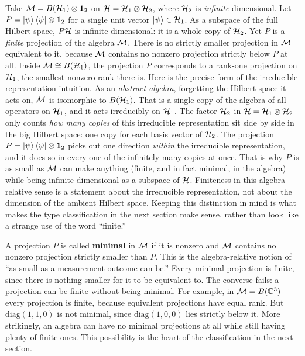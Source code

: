 Take $\mathcal{M}=B(\mathcal{H}_1)\otimes\mathbf{1}_2$ on $\mathcal{H}=\mathcal{H}_1\otimes\mathcal{H}_2$, where $\mathcal{H}_2$ is \emph{infinite}-dimensional. Let
$P=\ket\psi\bra\psi\otimes\mathbf{1}_2$ for a single unit vector $\ket\psi\in\mathcal{H}_1$. As a subspace of the full
Hilbert space, $P\mathcal{H}$ is infinite-dimensional: it is a whole copy of $\mathcal{H}_2$. Yet $P$ is a \emph{finite}
projection of the algebra $\mathcal{M}$. There is no strictly smaller projection in $\mathcal{M}$ equivalent to it, because
$\mathcal{M}$ contains no nonzero projection strictly below $P$ at all. Inside $\mathcal{M}\cong B(\mathcal{H}_1)$, the projection $P$
corresponds to a rank-one projection on $\mathcal{H}_1$, the smallest nonzero rank there is. Here is the precise form
of the irreducible-representation intuition. As an \emph{abstract algebra}, forgetting the Hilbert space it
acts on, $\mathcal{M}$ is isomorphic to $B(\mathcal{H}_1)$. That is a single copy of the algebra of all operators on $\mathcal{H}_1$,
and it acts irreducibly on $\mathcal{H}_1$. The factor $\mathcal{H}_2$ in $\mathcal{H}=\mathcal{H}_1\otimes\mathcal{H}_2$ only counts \emph{how many
copies} of this irreducible representation sit side by side in the big Hilbert space: one copy for each basis
vector of $\mathcal{H}_2$. The projection $P=\ket\psi\bra\psi\otimes\mathbf{1}_2$ picks out one direction \emph{within} the
irreducible representation, and it does so in every one of the infinitely many copies at once. That is why
$P$ is as small as $\mathcal{M}$ can make anything (finite, and in fact minimal, in the algebra) while being
infinite-dimensional as a subspace of $\mathcal{H}$. Finiteness in this algebra-relative sense is a statement about
the irreducible representation, not about the dimension of the ambient Hilbert space. Keeping this
distinction in mind is what makes the type classification in the next section make sense, rather than look
like a strange use of the word ``finite.''

A projection $P$ is called \textbf{minimal} in $\mathcal{M}$ if it is nonzero and $\mathcal{M}$ contains no nonzero projection
strictly smaller than $P$. This is the algebra-relative notion of ``as small as a measurement outcome can
be.'' Every minimal projection is finite, since there is nothing smaller for it to be equivalent to. The
converse fails: a projection can be finite without being minimal. For example, in $\mathcal{M}=B(\mathbb C^3)$ every
projection is finite, because equivalent projections have equal rank. But $\mathrm{diag}(1,1,0)$ is not
minimal, since $\mathrm{diag}(1,0,0)$ lies strictly below it. More strikingly, an algebra can have no minimal
projections at all while still having plenty of finite ones. This possibility is the heart of the
classification in the next section.

